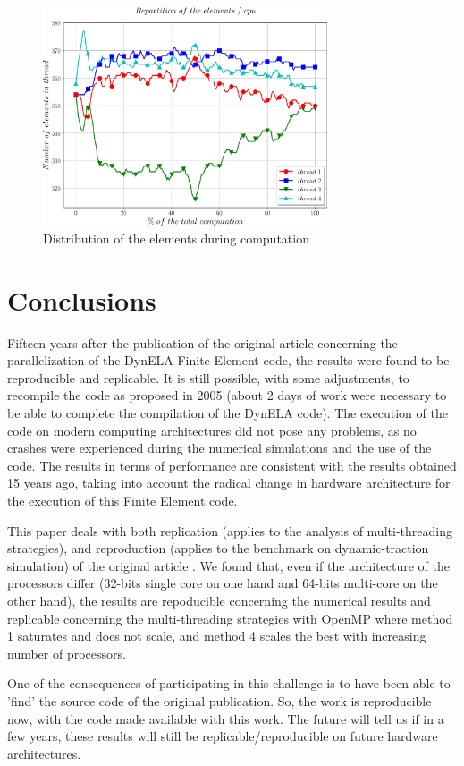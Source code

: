 \begin{figure}[h!] 
  \centering
  \includegraphics[width=0.75\textwidth]{./timethreads.pdf}
  \caption{Distribution of the elements during computation}
  \label{timethreads}
\end{figure}

\section {Conclusions}

Fifteen years after the publication of the original article \cite{Pantale:2005} concerning the parallelization of the DynELA Finite Element code, the results were found to be reproducible and replicable. It is still possible, with some adjustments, to recompile the code as proposed in 2005 (about 2 days of work were necessary to be able to complete the compilation of the DynELA code). The execution of the code on modern computing architectures did not pose any problems, as no crashes were experienced during the numerical simulations and the use of the code. The results in terms of performance are consistent with the results obtained 15 years ago, taking into account the radical change in hardware architecture for the execution of this Finite Element code.

This paper deals with both replication (applies to the analysis of multi-threading strategies), and reproduction (applies to the benchmark on dynamic-traction simulation) of the original article \cite{Pantale:2005}. We found that, even if the architecture of the processors differ (32-bits single core on one hand and 64-bits multi-core on the other hand), the results are repoducible concerning the numerical results and replicable concerning the multi-threading strategies with OpenMP where method 1 saturates and does not scale, and method 4 scales the best with increasing number of processors.

One of the consequences of participating in this challenge is to have been able to 'find' the source code of the original publication. So, the work is reproducible now, with the code made available with this work. The future will tell us if in a few years, these results will still be replicable/reproducible on future hardware architectures.

